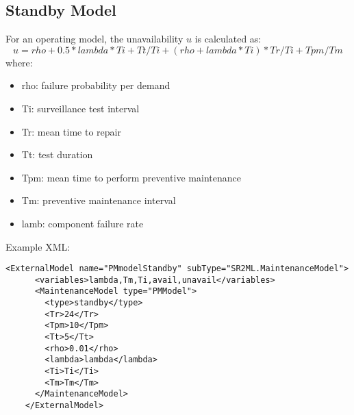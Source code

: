 \subsection{Standby Model}
For an operating model, the unavailability $u$ is calculated as:
\begin{equation}
  u = rho + 0.5*lambda*Ti + Tt/Ti + (rho+lambda*Ti)*Tr/Ti + Tpm/Tm
\end{equation}
where:
\begin{itemize}
  \item rho: failure probability per demand
  \item Ti: surveillance test interval
  \item Tr: mean time to repair
  \item Tt: test duration
  \item Tpm: mean time to perform preventive maintenance
  \item Tm: preventive maintenance interval
  \item lamb: component failure rate
\end{itemize}

Example XML:
\begin{lstlisting}[style=XML]
    <ExternalModel name="PMmodelStandby" subType="SR2ML.MaintenanceModel">
      <variables>lambda,Tm,Ti,avail,unavail</variables>
      <MaintenanceModel type="PMModel">
        <type>standby</type>
        <Tr>24</Tr>
        <Tpm>10</Tpm>
        <Tt>5</Tt>
        <rho>0.01</rho>
        <lambda>lambda</lambda>
        <Ti>Ti</Ti>
        <Tm>Tm</Tm>
      </MaintenanceModel>
    </ExternalModel>
\end{lstlisting}
